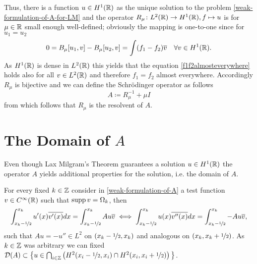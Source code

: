 Thus, there is a function $u \in H^{1}(\mathbb{R})$ as the unique solution to the problem \eqref{weak-formulation-of-A-for-LM} and the operator $R_{\mu} \colon L^{2}(\mathbb{R}) \rightarrow H^{1}(\mathbb{R}), f \mapsto u$ is for $\mu \in \mathbb{R}$ small enough well-defined; obviously the mapping is one-to-one since for $u_{1} = u_{2}$
	\begin{equation}
		0 = B_{\mu}[u_{1}, v] - B_{\mu}[u_{2}, v]= \int (f_{1} - f_{2}) \overline{v} \quad \forall v \in H^{1}(\mathbb{R}). \label{f1f2almosteverywhere}
	\end{equation} 
As $H^{1}(\mathbb{R})$ is dense in $L^{2}(\mathbb{R})$ this yields that the equation \eqref{f1f2almosteverywhere} holds also for all $v \in L^{2}(\mathbb{R})$ and therefore $f_{1} = f_{2}$ almost everywhere. Accordingly $R_{\mu}$ is bijective and we can define the Schrödinger operator as follows
		\[ A \coloneqq R_{\mu}^{-1} + \mu I \]
from which follows that $R_{\mu}$ is the resolvent of $A$.

\section{The Domain of $A$}
Even though Lax Milgram's Theorem guarantees a solution $u \in H^{1}(\mathbb{R})$ the operator $A$ yields additional properties for the solution, i.e. the domain of $A$. 

For every fixed $k \in \mathbb{Z}$ consider in \eqref{weak-formulation-of-A} a test function $v \in C^{\infty}(\mathbb{R})$ such that $\operatorname{supp} v = \Omega_{k}$, then
	\[ \int_{x_{k}-\nicefrac{1}{2}}^{x_{k}} u'(x) \overline{v'(x)} dx = \int_{x_{k}-\nicefrac{1}{2}}^{x_{k}} A u \overline{v} \iff \int_{x_{k}-\nicefrac{1}{2}}^{x_{k}} u(x) \overline{v''(x)} dx = \int_{x_{k}-\nicefrac{1}{2}}^{x_{k}} - A u \overline{v}, \]
such that $A u = - u'' \in L^{2}$ on $(x_{k} -\nicefrac{1}{2}, x_{k})$ and analogous on $(x_{k}, x_{k} + \nicefrac{1}{2})$.
As $k \in \mathbb{Z}$ was arbitrary we can fixed $\mathcal{D}(A) \subset \big\{ u \in \bigcap_{i \in \mathbb{Z}} \left( H^{2}(x_{i}-\nicefrac{1}{2}, x_{i}) \cap H^{2}(x_{i}, x_{i} + \nicefrac{1}{2}) \right)\big\}$. \\

